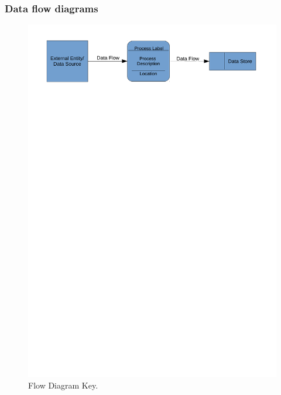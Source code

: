 \subsubsection{Data flow diagrams}

\begin{center}
    \begin{figure}[H]
        \includegraphics[width=\textwidth]{./Analysis/Dataflow/DFD_analysis_key.pdf}
        \caption{Flow Diagram Key.} \label{fig:print_function_result}
    \end{figure}


\end{center}
